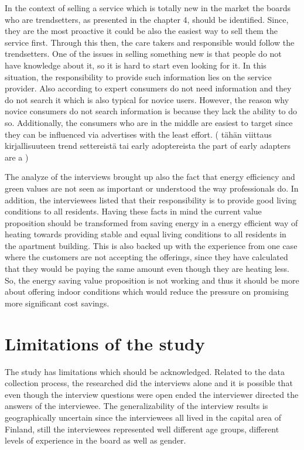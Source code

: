 In the context of selling a service which is totally new in the market the boards who are trendsetters, as presented in the chapter 4, should be identified. Since, they are the most proactive it could be also the easiest way to sell them the service first. Through this then, the care takers and responsible would follow the trendsetters. One of the issues in selling something new is that people do not have knowledge about it, so it is hard to start even looking for it. In this situation, the responsibility to provide such information lies on the service provider. Also according to \textcite{PurchaseDecisionMaking:2011} expert consumers do not need information and they do not search it which is also typical for novice users. However, the reason why novice consumers do not search information is because they lack the ability to do so. Additionally, the consumers who are in the middle are easiest to target since they can be influenced via advertises with the least effort. ( tähän viittaus kirjallisuuteen trend settereistä tai early adoptereista the part of early adapters are a ) 

The analyze of the interviews brought up also the fact that energy efficiency and green values are not seen as important or understood the way professionals do. In addition, the interviewees listed that their responsibility is to provide good living conditions to all residents. Having these facts in mind the current value proposition should be transformed from saving energy in a energy efficient way of heating towards providing stable and equal living conditions to all residents in the apartment building. This is also backed up with the experience from one case where the customers are not accepting the offerings, since they have calculated that they would be paying the same amount even though they are heating less. So, the energy saving value proposition is not working and thus it should be more about offering indoor conditions which would reduce the pressure on promising more significant cost savings.

\section{Limitations of the study}

The study has limitations which should be acknowledged. Related to the data collection process, the researched did the interviews alone and it is possible that even though the interview questions were open ended the interviewer directed the answers of the interviewee. The generalizability of the interview results is geographically uncertain since the interviewees all lived in the capital area of Finland, still the interviewees represented well different age groups, different levels of experience in the board as well as gender.

